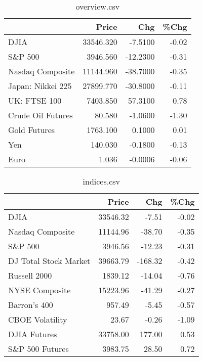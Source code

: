 \documentclass{article}%
\begin{document}
\begin{table}[htbp]%
\caption{overview.csv}%
\centering%
\begin{adjustbox}{width=1\textwidth}%
\begin{tabular}{lrrr}
\toprule
                  &     Price &      Chg &  \%Chg \\
\midrule
             DJIA & 33546.320 &  -7.5100 & -0.02 \\
          S\&P 500 &  3946.560 & -12.2300 & -0.31 \\
 Nasdaq Composite & 11144.960 & -38.7000 & -0.35 \\
Japan: Nikkei 225 & 27899.770 & -30.8000 & -0.11 \\
     UK: FTSE 100 &  7403.850 &  57.3100 &  0.78 \\
Crude Oil Futures &    80.580 &  -1.0600 & -1.30 \\
     Gold Futures &  1763.100 &   0.1000 &  0.01 \\
              Yen &   140.030 &  -0.1800 & -0.13 \\
             Euro &     1.036 &  -0.0006 & -0.06 \\
\bottomrule
\end{tabular}
%
\end{adjustbox}%
\end{table}

%


\begin{table}[htbp]%
\caption{indices.csv}%
\centering%
\begin{adjustbox}{width=1\textwidth}%
\begin{tabular}{lrrr}
\toprule
                      &    Price &     Chg &  \%Chg \\
\midrule
                 DJIA & 33546.32 &   -7.51 & -0.02 \\
     Nasdaq Composite & 11144.96 &  -38.70 & -0.35 \\
              S\&P 500 &  3946.56 &  -12.23 & -0.31 \\
DJ Total Stock Market & 39663.79 & -168.32 & -0.42 \\
         Russell 2000 &  1839.12 &  -14.04 & -0.76 \\
       NYSE Composite & 15223.96 &  -41.29 & -0.27 \\
         Barron's 400 &   957.49 &   -5.45 & -0.57 \\
      CBOE Volatility &    23.67 &   -0.26 & -1.09 \\
         DJIA Futures & 33758.00 &  177.00 &  0.53 \\
      S\&P 500 Futures &  3983.75 &   28.50 &  0.72 \\
\bottomrule
\end{tabular}
%
\end{adjustbox}%
\end{table}
\end{document}
